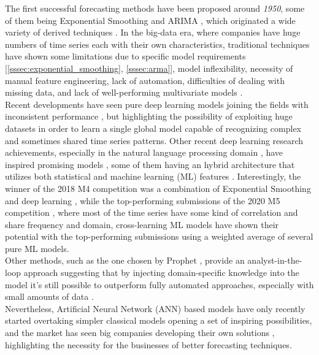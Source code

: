 \documentclass[a4paper]{article} %
\begin{document}
	The first successful forecasting methods have been proposed around \textit{1950}, some of them being Exponential Smoothing \cite{ExponentialSmoothingHoltCharles} and ARIMA \cite{ForecastingBoxJenkins}, which originated a wide variety of derived techniques \cite{25YearsForecasting}. In the big-data era, where companies have huge numbers of time series each with their own characteristics, traditional techniques have shown some limitations due to specific model requirements [\ref{sssec:exponential_smoothing}, \ref{sssec:arma}], model inflexibility, necessity of manual feature engineering, lack of automation, difficulties of dealing with missing data, and lack of well-performing multivariate models \cite{25YearsForecasting}.\\
	Recent developments have seen pure deep learning models joining the fields with inconsistent performance \cite{DeepLearningForecastingSurvey}, but highlighting the possibility of exploiting huge datasets in order to learn a single global model capable of recognizing complex and sometimes shared time series patterns. Other recent deep learning research achievements, especially in the natural language processing domain \cite{RNNLSTM, seq2seq, EncoderDecoder}, have inspired promising models \cite{DeepAR, DeepState, DeepLearningForecastingSurvey}, some of them having an hybrid architecture that utilizes both statistical and machine learning (ML) features \cite{MAKRIDAKIS2018802, GluonTS}. 
	Interestingly, the winner of the 2018 M4 competition \cite{MAKRIDAKIS2018802} was a combination of Exponential Smoothing and deep learning \cite{UberHybridES}, while the top-performing submissions of the 2020 M5 competition \cite{M5Competition}, where most of the time series have some kind of correlation and share frequency and domain, cross-learning ML models have shown their potential with the top-performing submissions using a weighted average of several pure ML models.\\
	Other methods, such as the one chosen by Prophet \cite{FacebookProphet}, provide an analyst-in-the-loop approach suggesting that by injecting domain-specific knowledge into the model it's still possible to outperform fully automated approaches, especially with small amounts of data .\\
	Nevertheless, Artificial Neural Network (ANN) based models have only recently started overtaking simpler classical models \cite{MAKRIDAKIS2018802, M5Competition} opening a set of inspiring possibilities, and the market has seen big companies developing their own solutions \cite{FacebookProphet, GluonTS, MicrosoftSSA, UberHybridES}, highlighting the necessity for the businesses of better forecasting techniques.
	
\end{document}
